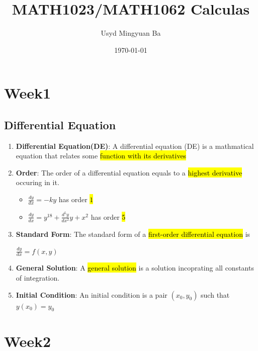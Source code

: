 \documentclass{article}
\title{MATH1023/MATH1062 Calculas}
\author{Usyd Mingyuan Ba}
\date{\today}
\begin{document}
\maketitle

\section{Week1}
  \subsection{Differential Equation}
  \begin{enumerate}

    \item \textbf{Differential Equation(DE)}: A differential equation (DE) is a mathmatical equation that relates some \hl{function with its derivatives}

    \item \textbf{Order}: The order of a differential equation equals to a \hl{highest derivative} occuring in it.
      \begin{itemize}
        \item $\frac{dy}{dx} = -ky$ has order \hl{$1$}
        \item $\frac{dy}{dx} = y^{18} + \frac{d^5y}{dx^2}y + x^2$ has order \hl{5}
      \end{itemize}

    \item \textbf{Standard Form}: The standard form of a \hl{first-order differential equation} is
      \begin{center}
        $\frac{dy}{dx} = f(x,y)$
      \end{center}

    \item \textbf{General Solution}: A \hl{general solution} is a solution incoprating all constants of integration.

    \item \textbf{Initial Condition}: An initial condition is a pair $(x_0,y_0)$ such that $y(x_0) = y_0$


  \end{enumerate}


\section{Week2}
\end{document}
